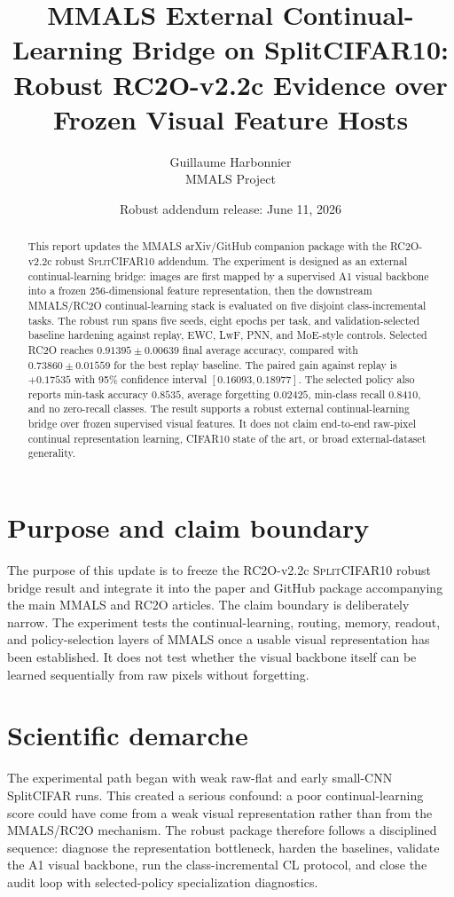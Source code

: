 \documentclass[11pt]{article}
\title{\textbf{MMALS External Continual-Learning Bridge on SplitCIFAR10:\\Robust RC2O-v2.2c Evidence over Frozen Visual Feature Hosts}}
\author{Guillaume Harbonnier \\ MMALS Project}
\date{Robust addendum release: June 11, 2026}
\newcommand{\mmals}{\textsc{MMALS}}
\newcommand{\rc}{\textsc{RC2O}}
\newcommand{\splitcifar}{\textsc{SplitCIFAR10}}
\begin{document}
\maketitle
\begin{abstract}
This report updates the \mmals{} arXiv/GitHub companion package with the \rc{}-v2.2c robust \splitcifar{} addendum. The experiment is designed as an external continual-learning bridge: images are first mapped by a supervised A1 visual backbone into a frozen 256-dimensional feature representation, then the downstream \mmals{}/\rc{} continual-learning stack is evaluated on five disjoint class-incremental tasks. The robust run spans five seeds, eight epochs per task, and validation-selected baseline hardening against replay, EWC, LwF, PNN, and MoE-style controls. Selected \rc{} reaches $0.91395\pm0.00639$ final average accuracy, compared with $0.73860\pm0.01559$ for the best replay baseline. The paired gain against replay is $+0.17535$ with 95\% confidence interval $[0.16093,0.18977]$. The selected policy also reports min-task accuracy $0.8535$, average forgetting $0.02425$, min-class recall $0.8410$, and no zero-recall classes. The result supports a robust external continual-learning bridge over frozen supervised visual features. It does not claim end-to-end raw-pixel continual representation learning, CIFAR10 state of the art, or broad external-dataset generality.
\end{abstract}

\section{Purpose and claim boundary}
The purpose of this update is to freeze the \rc{}-v2.2c \splitcifar{} robust bridge result and integrate it into the paper and GitHub package accompanying the main \mmals{} and \rc{} articles. The claim boundary is deliberately narrow. The experiment tests the continual-learning, routing, memory, readout, and policy-selection layers of \mmals{} once a usable visual representation has been established. It does not test whether the visual backbone itself can be learned sequentially from raw pixels without forgetting.

\begin{table}[H]
\centering
\caption{Supported and unsupported claims.}

\end{table}

\section{Scientific demarche}
The experimental path began with weak raw-flat and early small-CNN SplitCIFAR runs. This created a serious confound: a poor continual-learning score could have come from a weak visual representation rather than from the \mmals{}/\rc{} mechanism. The robust package therefore follows a disciplined sequence: diagnose the representation bottleneck, harden the baselines, validate the A1 visual backbone, run the class-incremental CL protocol, and close the audit loop with selected-policy specialization diagnostics.
\end{document}
